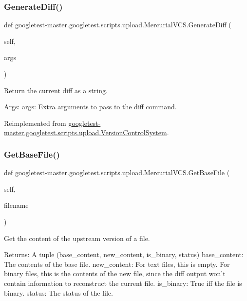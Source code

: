 \subsubsection{\texorpdfstring{GenerateDiff()}{GenerateDiff()}}
{\footnotesize\ttfamily def googletest-\/master.\+googletest.\+scripts.\+upload.\+Mercurial\+V\+C\+S.\+Generate\+Diff (\begin{DoxyParamCaption}\item[{}]{self,  }\item[{}]{args }\end{DoxyParamCaption})}

\begin{DoxyVerb}Return the current diff as a string.

Args:
  args: Extra arguments to pass to the diff command.
\end{DoxyVerb}
 

Reimplemented from \mbox{\hyperlink{classgoogletest-master_1_1googletest_1_1scripts_1_1upload_1_1_version_control_system_a655beae832bab0a437542ee635477485}{googletest-\/master.\+googletest.\+scripts.\+upload.\+Version\+Control\+System}}.

\mbox{\label{classgoogletest-master_1_1googletest_1_1scripts_1_1upload_1_1_mercurial_v_c_s_a7a235347ff9c9a5b31c965b979c7fd45}} 
\subsubsection{\texorpdfstring{GetBaseFile()}{GetBaseFile()}}
{\footnotesize\ttfamily def googletest-\/master.\+googletest.\+scripts.\+upload.\+Mercurial\+V\+C\+S.\+Get\+Base\+File (\begin{DoxyParamCaption}\item[{}]{self,  }\item[{}]{filename }\end{DoxyParamCaption})}

\begin{DoxyVerb}Get the content of the upstream version of a file.

Returns:
  A tuple (base_content, new_content, is_binary, status)
base_content: The contents of the base file.
new_content: For text files, this is empty.  For binary files, this is
  the contents of the new file, since the diff output won't contain
  information to reconstruct the current file.
is_binary: True iff the file is binary.
status: The status of the file.
\end{DoxyVerb}
 

